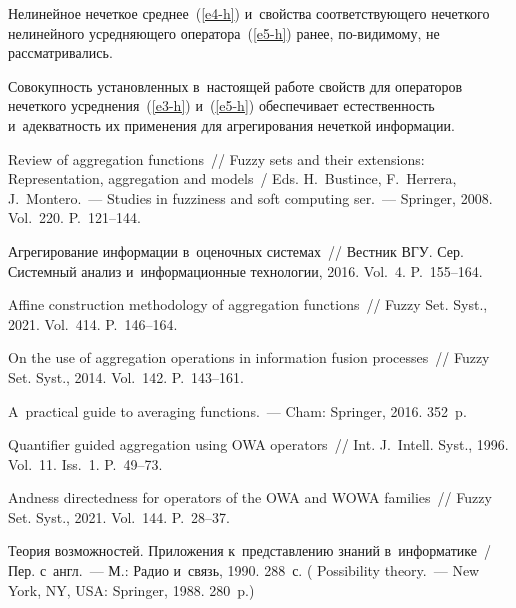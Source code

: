 \begin{multicols}{2}
Нелинейное нечеткое среднее~(\ref{e4-h}) и~свойства соответствующего нечеткого 
нелинейного усред\-ня\-юще\-го оператора~(\ref{e5-h}) ранее, по-ви\-ди\-мо\-му, не рас\-смат\-ри\-ва\-лись.

Совокупность установленных в~настоящей работе свойств для операторов нечеткого 
усреднения~(\ref{e3-h}) и~(\ref{e5-h}) обеспечивает естественность и~адекватность их применения 
для агрегирования нечеткой информации.

\vspace*{-6pt}

{\small\frenchspacing
 {%
 \begin{thebibliography}{99}
Review of aggregation functions~// Fuzzy sets and their extensions: 
Representation, aggregation and models~/ Eds. H.~Bustince, F.~Herrera, J.~Montero.~--- 
 Studies in fuzziness and soft computing ser.~--- Springer, 2008. Vol.~220. P.~121--144.

 Агрегирование информации в~оценочных системах~// Вестник ВГУ. Сер. Сис\-тем\-ный анализ и~информационные 
технологии, 2016. Vol.~4. P.~155--164.

 Affine construction 
methodology of aggregation functions~// Fuzzy Set. Syst., 2021. Vol.~414. 
P.~146--164.

 On the use of aggregation operations in 
information fusion processes~// Fuzzy Set. Syst., 2014. Vol.~142. P.~143--161.

 A~practical guide to 
averaging functions.~--- Cham: Springer, 2016. 352~p.

 Quantifier guided aggregation using OWA operators~// Int. J.~Intell. Syst., 1996. Vol.~11. Iss.~1. P.~49--73.

 Andness directedness for operators of the OWA and 
WOWA families~// Fuzzy Set. Syst., 2021. Vol.~144. P.~28--37.



 Теория возможностей. Приложения к~пред\-став\-ле\-нию знаний в~информатике~/ Пер. с~англ.~--- М.: Радио и~связь, 1990. 288~с.
( {Possibility theory}.~--- New York, NY, USA: Springer, 1988. 280~p.)


\end{thebibliography}}}
\end{multicols}

